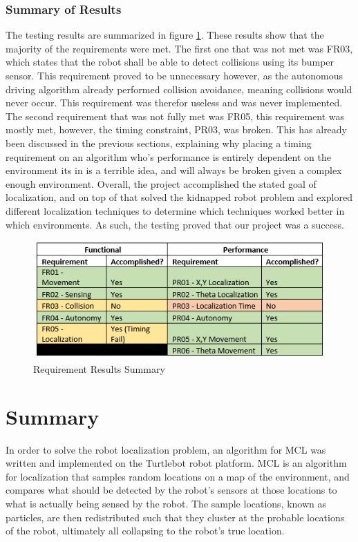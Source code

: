 \documentclass{article}
\newcommand\tab[1][0.5cm]{\hspace*{#1}}
\begin{document}
\subsubsection{Summary of Results}
\tab The testing results are summarized in figure \ref{fig:results_summary}. These results show that the majority of the requirements were met. The first one that was not met was FR03, which states that the robot shall be able to detect collisions using its bumper sensor. This requirement proved to be unnecessary however, as the autonomous driving algorithm already performed collision avoidance, meaning collisions would never occur. This requirement was therefor useless and was never implemented. The second requirement that was not fully met was FR05, this requirement was mostly met, however, the timing constraint, PR03, was broken. This has already been discussed in the previous sections, explaining why placing a timing requirement on an algorithm who's performance is entirely dependent on the environment its in is a terrible idea, and will always be broken given a complex enough environment. Overall, the project accomplished the stated goal of localization, and on top of that solved the kidnapped robot problem and explored different localization techniques to determine which techniques worked better in which environments. As such, the testing proved that our project was a success.

\begin{figure}[h!]
\centering
\includegraphics[scale=1.0]{Requirements-Summary.PNG}
\caption{Requirement Results Summary}
\label{fig:results_summary}
\end{figure}

\section{Summary}
\tab In order to solve the robot localization problem, an algorithm for MCL was written and implemented on the Turtlebot robot platform. MCL is an algorithm for localization that samples random locations on a map of the environment, and compares what should be detected by the robot's sensors at those locations to what is actually being sensed by the robot. The sample locations, known as particles, are then redistributed such that they cluster at the probable locations of the robot, ultimately all collapsing to the robot's true location.\\
\end{document}

